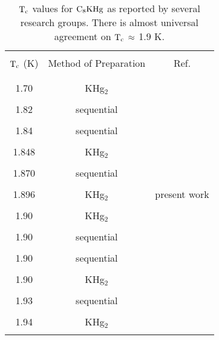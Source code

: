 \begin{table}
\caption[$\rm T_c$ values reported for $\rm C_8KHg$.]{$\rm T_c$
values for  $\rm C_8KHg$ as reported by several research
groups.  There is almost universal agreement on $\rm T_c \: \approx$ 1.9 K.}
\label{stiitc}
\begin{center}
\begin{tabular}{||c|c|c||}
\hline
& & \\
$\rm T_c$ (K) & Method of Preparation & Ref.\\
& & \\
\hline
& & \\
1.70 & KHg$_2$  & \cite{koike81}\\
& & \\
1.82&  sequential  & \cite{iye83}\\
& & \\
1.84 & sequential  & \cite{iye83}\\
& & \\
1.848 & KHg$_2$ & \cite{delong82a} \\
& & \\
1.870 & sequential & \cite{delong82a} \\
& & \\
1.896 & KHg$_2$ & present work \\
& & \\
1.90 & KHg$_2$  & \cite{koike81}\\ 
& & \\
1.90 & sequential   & \cite{vogel81}\\
& & \\
1.90 & sequential  & \cite{pendrys81} \\
& & \\
1.90 & KHg$_2$  & \cite{tanuma81} \\
& & \\
1.93 & sequential  & \cite{alexander81} \\
& & \\
1.94 & KHg$_2$  & \cite{tanuma81} \\
& & \\
\hline
\end{tabular}
\end{center}
\end{table}

